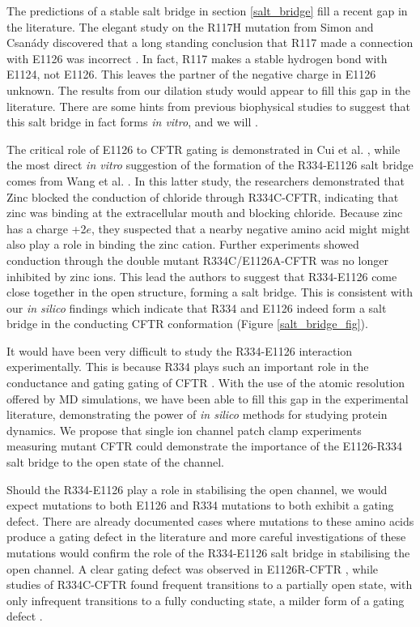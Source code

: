The predictions of a stable salt bridge in section \ref{salt_bridge} fill a recent gap in the literature. The elegant study on the R117H mutation from Simon and Csanády \cite{simon2021} discovered that a long standing conclusion that R117 made a connection with E1126 was incorrect \cite{cui2014}. In fact, R117 makes a stable hydrogen bond with E1124, not E1126. This leaves the partner of the negative charge in E1126 unknown. The results from our dilation study would appear to fill this gap in the literature. There are some hints from previous biophysical studies to suggest that this salt bridge in fact forms \textit {in vitro}, and we will .

The critical role of E1126 to CFTR gating is demonstrated in Cui et al. \cite{cui2014}, while the most direct \textit{in vitro} suggestion of the formation of the R334-E1126 salt bridge comes from Wang et al. \cite{wang2016}. In this latter study, the researchers demonstrated that Zinc blocked the conduction of chloride through R334C-CFTR, indicating that zinc was binding at the extracellular mouth and blocking chloride. Because zinc has a charge +2$e$, they suspected that a nearby negative amino acid might might also play a role in binding the zinc cation. Further experiments showed conduction through the double mutant R334C/E1126A-CFTR was no longer inhibited by zinc ions. This lead the authors to suggest that R334-E1126 come close together in the open structure, forming a salt bridge. This is consistent with our \textit{in silico} findings which indicate that R334 and E1126 indeed form a salt bridge in the conducting CFTR conformation (Figure \ref{salt_bridge_fig}).  

It would have been very difficult to study the R334-E1126 interaction experimentally. This is because R334 plays such an important role in the conductance and gating gating of CFTR \cite{zhang2005,zhang2005a, gong2004, wang2012}. With the use of the atomic resolution offered by MD simulations, we have been able to fill this gap in the experimental literature, demonstrating the power of \textit {in silico} methods for studying protein dynamics. We propose that single ion channel patch clamp experiments measuring mutant CFTR could demonstrate the importance of the E1126-R334 salt bridge to the open state of the channel. 

Should the R334-E1126 play a role in stabilising the open channel, we would expect mutations to both E1126 and R334 mutations to both exhibit a gating defect. There are already documented cases where mutations to these amino acids produce a gating defect in the literature and more careful investigations of these mutations would confirm the role of the R334-E1126 salt bridge in stabilising the open channel. A clear gating defect was observed in E1126R-CFTR \cite{cui2014}, while studies of R334C-CFTR found frequent transitions to a partially open state, with only infrequent transitions to a fully conducting state, a milder form of a gating defect \cite{zhang2005a}. 

